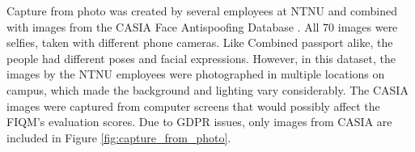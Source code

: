 %
Capture from photo was created by several employees at NTNU and combined with images from the CASIA Face Antispoofing Database \cite{CASIA-FAD}. All 70 images were selfies, taken with different phone cameras. Like Combined passport alike, the people had different poses and facial expressions. However, in this dataset, the images by the NTNU employees were photographed in multiple locations on campus, which made the background and lighting vary considerably. The CASIA images were captured from computer screens that would possibly affect the FIQM's evaluation scores. Due to GDPR issues, only images from CASIA are included in Figure \ref{fig:capture_from_photo}.
%

